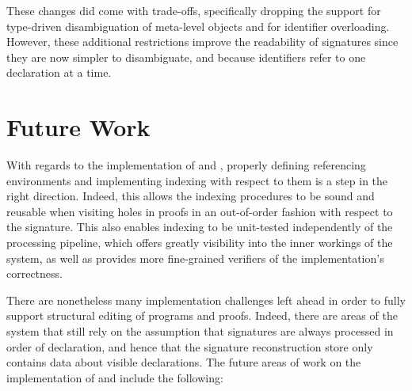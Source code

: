 These changes did come with trade-offs, specifically dropping the support for type-driven disambiguation of meta-level objects and for identifier overloading.
However, these additional restrictions improve the readability of \Beluga signatures since they are now simpler to disambiguate, and because identifiers refer to one declaration at a time.

\section{Future Work}

With regards to the implementation of \Beluga and \Harpoon, properly defining referencing environments and implementing indexing with respect to them is a step in the right direction.
Indeed, this allows the indexing procedures to be sound and reusable when visiting holes in \Harpoon proofs in an out-of-order fashion with respect to the \Beluga signature.
This also enables indexing to be unit-tested independently of the processing pipeline, which offers greatly visibility into the inner workings of the system, as well as provides more fine-grained verifiers of the implementation's correctness.

There are nonetheless many implementation challenges left ahead in order to fully support structural editing of \Beluga programs and \Harpoon proofs.
Indeed, there are areas of the system that still rely on the assumption that signatures are always processed in order of declaration, and hence that the signature reconstruction store only contains data about visible declarations.
The future areas of work on the implementation of \Beluga and \Harpoon include the following:


